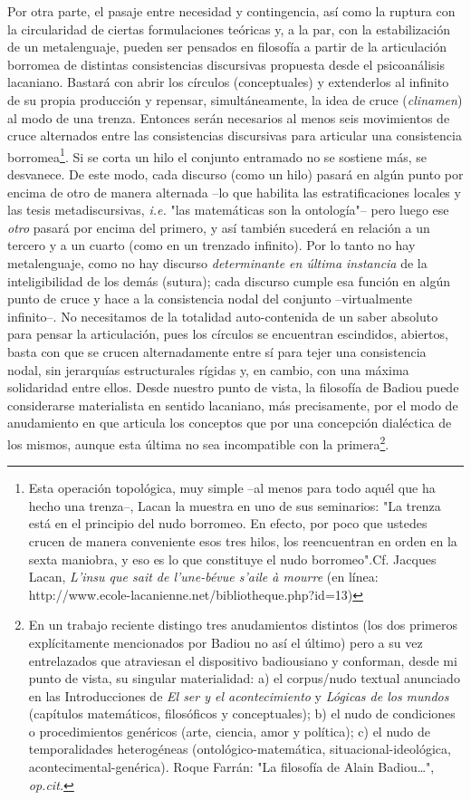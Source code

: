 \documentclass{book}
\begin{document}
Por otra parte, el pasaje entre necesidad y contingencia, así como la
ruptura con la circularidad de ciertas formulaciones teóricas y, a la
par, con la estabilización de un metalenguaje, pueden ser pensados en
filosofía a partir de la articulación borromea de distintas
consistencias discursivas propuesta desde el psicoanálisis lacaniano.
Bastará con abrir los círculos (conceptuales) y extenderlos al infinito
de su propia producción y repensar, simultáneamente, la idea de cruce
(\emph{clinamen}) al modo de una trenza. Entonces serán necesarios al
menos seis movimientos de cruce alternados entre las consistencias
discursivas para articular una consistencia borromea\footnote{Esta
  operación topológica, muy simple --al menos para todo aquél que ha
  hecho una trenza--, Lacan la muestra en uno de sus seminarios: "La
  trenza está en el principio del nudo borromeo. En efecto, por poco que
  ustedes crucen de manera conveniente esos tres hilos, los reencuentran
  en orden en la sexta maniobra, y eso es lo que constituye el nudo
  borromeo".Cf. Jacques Lacan, \emph{L'insu que sait de l'une-bévue
  s'aile à mourre} (en línea:
  http://www.ecole-lacanienne.net/bibliotheque.php?id=13)}. Si se corta
un hilo el conjunto entramado no se sostiene más, se desvanece. De este
modo, cada discurso (como un hilo) pasará en algún punto por encima de
otro de manera alternada --lo que habilita las estratificaciones locales
y las tesis metadiscursivas, \emph{i.e.} "las matemáticas son la
ontología"-- pero luego ese \emph{otro} pasará por encima del primero, y
así también sucederá en relación a un tercero y a un cuarto (como en un
trenzado infinito). Por lo tanto no hay metalenguaje, como no hay
discurso \emph{determinante en última instancia} de la inteligibilidad
de los demás (sutura); cada discurso cumple esa función en algún punto
de cruce y hace a la consistencia nodal del conjunto --virtualmente
infinito--. No necesitamos de la totalidad auto-contenida de un saber
absoluto para pensar la articulación, pues los círculos se encuentran
escindidos, abiertos, basta con que se crucen alternadamente entre sí
para tejer una consistencia nodal, sin jerarquías estructurales rígidas
y, en cambio, con una máxima solidaridad entre ellos. Desde nuestro
punto de vista, la filosofía de Badiou puede considerarse materialista
en sentido lacaniano, más precisamente, por el modo de anudamiento en
que articula los conceptos que por una concepción dialéctica de los
mismos, aunque esta última no sea incompatible con la
primera\footnote{En un trabajo reciente distingo tres anudamientos
  distintos (los dos primeros explícitamente mencionados por Badiou no
  así el último) pero a su vez entrelazados que atraviesan el
  dispositivo badiousiano y conforman, desde mi punto de vista, su
  singular materialidad: a) el corpus/nudo textual anunciado en las
  Introducciones de \emph{El ser y el acontecimiento} y \emph{Lógicas de
  los mundos} (capítulos matemáticos, filosóficos y conceptuales); b) el
  nudo de condiciones o procedimientos genéricos (arte, ciencia, amor y
  política); c) el nudo de temporalidades heterogéneas
  (ontológico-matemática, situacional-ideológica,
  acontecimental-genérica). Roque Farrán: "La filosofía de Alain
  Badiou\ldots", \emph{op.cit.}}.
\end{document}
